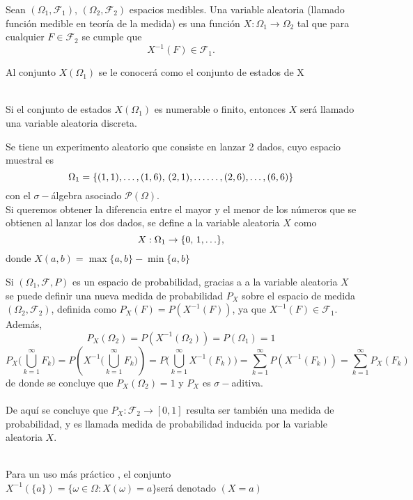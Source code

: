 \begin{Def}
    Sean $(\Omega_1,\mathscr{F}_1)$, $(\Omega_2,\mathscr{F}_2)$ espacios medibles. Una variable aleatoria (llamado función medible en teoría de la medida) es una función $X:\Omega_1\rightarrow \Omega_2$ tal que para cualquier $F\in\mathscr{F}_2$ se cumple que $$X^{-1}(F)\in\mathscr{F}_1.$$
\end{Def}
 Al conjunto $X(\Omega_1)$ se le conocerá como el conjunto de estados de X\\\\
\begin{Obs}
    Si el conjunto de estados $X(\Omega_1)$ es numerable o finito, entonces $X$ será llamado una variable aleatoria discreta.
\end{Obs}
\begin{Ejm}
  Se tiene un experimento aleatorio que consiste en lanzar 2 dados, cuyo  espacio muestral es $$\Omega_1=\{(1,1),\ldots,(1,6),\thinspace(2,1),\ldots\ldots,(2,6),\ldots,(6,6)\}$$ con el $\sigma-$álgebra asociado $\mathscr{P}(\Omega)$.\\ 
   Si queremos obtener la diferencia entre el mayor y el menor de los números que se obtienen al lanzar los dos dados, se define a la variable aleatoria $X$ como $$X:\Omega_1\rightarrow \{0,\thinspace 1,\ldots\},$$ donde $X(a,b)=\max \{a,b\}-\min\{a,b\}$
\end{Ejm}
Si $(\Omega_1,\mathscr{F},P)$ es un espacio de probabilidad, gracias a a la variable aleatoria $X$ se puede definir una nueva medida de probabilidad $P_X$ sobre el espacio de medida $(\Omega_2,\mathscr{F}_2)$, definida como $P_X(F)=P(X^{-1}(F))$, ya que $X^{-1}(F)\in\mathscr{F}_1$. Además, $$P_X(\Omega_2)=P(X^{-1}(\Omega_2))=P(\Omega_1)=1$$ $$P_X\big(\bigcup_{k=1}^\infty F_k\big)=P(X^{-1}\big(\bigcup_{k=1}^\infty
F_k\big))=P \big(\bigcup_{k=1}^\infty X^{-1}(F_k) \big)=\sum_{k=1}^\infty P(X^{-1}(F_k))=\sum_{k=1}^\infty P_X(F_k)$$
de donde se concluye que $P_X(\Omega_2)= 1$ y $P_X$ es $\sigma-$aditiva.\\\\
De aquí se concluye que $P_X:\mathscr{F_2}\rightarrow [0,1]$ resulta ser también una medida de probabilidad, y es llamada medida de probabilidad inducida por la variable aleatoria $X$.\\\\
\begin{Obs}
    Para un uso más práctico , el conjunto\\ $X^{-1}(\{a\})=\{\omega\in\Omega: X(\omega)=a\}$será denotado $(X= a)$\\
\end{Obs}
